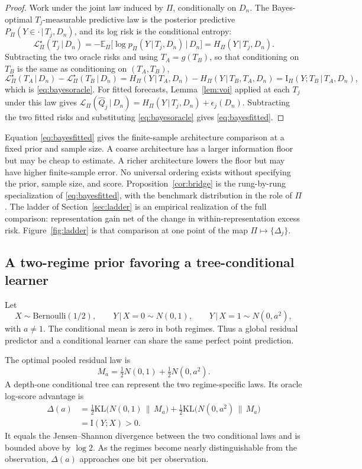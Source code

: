 \documentclass[11pt]{article}
\theoremstyle{remark}
\newcommand{\E}{\mathbb{E}}
\newcommand{\KL}{\mathrm{KL}}
\newcommand{\I}{\mathrm{I}}
\newcommand{\given}{\,|\,}
\newcommand{\Dn}{D_n}
\newcommand{\Loss}{\mathcal{L}}
\begin{document}
\begin{proof}
Work under the joint law induced by $\Pi$, conditionally on $\Dn$. The Bayes-optimal
$T_j$-measurable predictive law is the posterior predictive $P_\Pi(Y\in\cdot\given
T_j,\Dn)$, and its log risk is the conditional entropy:
\[
\Loss^\star_\Pi(T_j\given\Dn)
=-\E_\Pi\big[\log p_\Pi(Y\given T_j,\Dn)\,\big|\,\Dn\big]
=H_\Pi(Y\given T_j,\Dn).
\]
Subtracting the two oracle risks and using $T_A=g(T_B)$, so that conditioning on $T_B$ is the
same as conditioning on $(T_A,T_B)$,
\[
\Loss^\star_\Pi(T_A\given\Dn)-\Loss^\star_\Pi(T_B\given\Dn)
=H_\Pi(Y\given T_A,\Dn)-H_\Pi(Y\given T_B,T_A,\Dn)
=\I_\Pi(Y;T_B\given T_A,\Dn),
\]
which is \eqref{eq:bayesoracle}. For fitted forecasts, Lemma~\ref{lem:voi} applied at each
$T_j$ under this law gives
$\Loss_\Pi(\widehat Q_j\given\Dn)=H_\Pi(Y\given T_j,\Dn)+\epsilon_j(\Dn)$.
Subtracting the two fitted risks and substituting \eqref{eq:bayesoracle} gives
\eqref{eq:bayesfitted}.
\end{proof}

Equation \eqref{eq:bayesfitted} gives the finite-sample architecture comparison at a fixed
prior and sample size. A coarse architecture has a
larger information floor but may be cheap to estimate. A richer architecture lowers the floor
but may have higher finite-sample error. No universal ordering exists without specifying the prior, sample size, and score.
Proposition~\ref{cor:bridge} is the rung-by-rung specialization of \eqref{eq:bayesfitted},
with the benchmark distribution in the role of $\Pi$. The ladder of Section~\ref{sec:ladder}
is an empirical realization of the full comparison: representation gain net of the change in
within-representation excess risk. Figure~\ref{fig:ladder} is that comparison at one point
of the map $\Pi\mapsto\{\Delta_j\}$.

\subsection{A two-regime prior favoring a tree-conditional learner}\label{sec:tworegime}

Let
\[
X\sim\mathrm{Bernoulli}(1/2),\qquad Y\given X{=}0\sim N(0,1),\qquad Y\given X{=}1\sim N(0,a^2),
\]
with $a\neq1$. The conditional mean is zero in both regimes. Thus a global residual predictor
and a conditional learner can share the same perfect point prediction.

The optimal pooled residual law is
\[
M_a=\tfrac12 N(0,1)+\tfrac12 N(0,a^2).
\]
A depth-one conditional tree can represent the two regime-specific laws. Its oracle log-score
advantage is
\begin{align}
\Delta(a)&=\tfrac12\KL\big(N(0,1)\,\|\,M_a\big)+\tfrac12\KL\big(N(0,a^2)\,\|\,M_a\big)
\label{eq:jsd}\\
&=\I(Y;X)>0.\nonumber
\end{align}
It equals the Jensen--Shannon divergence between the two conditional laws and is bounded above
by $\log2$. As the regimes become nearly distinguishable from the observation, $\Delta(a)$
approaches one bit per observation.
\end{document}
